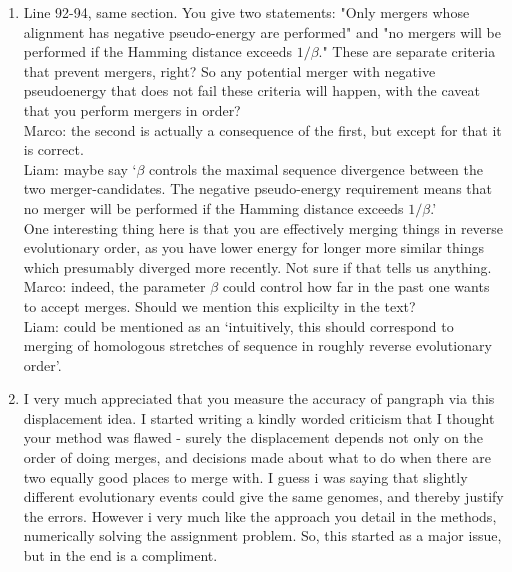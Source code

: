 \documentclass[aps,rmp,onecolumn]{revtex4-1}
\newcommand{\Marco}[1]{{\color{gray}Marco: #1}}
\newcommand{\Liam}[1]{{\color{teal}Liam: #1}}
\begin{document}
\begin{enumerate}
      \item Line 92-94, same section. You give two statements:
            "Only mergers whose alignment has negative pseudo-energy are performed"
            and
            "no mergers will be performed if the Hamming distance exceeds $1/\beta$."
            These are separate criteria that prevent mergers, right? So any potential merger with negative pseudoenergy that does not fail these criteria will happen, with the caveat that you perform mergers in order?\\
            \Marco{the second is actually a consequence of the first, but except for that it is correct.}\\
            \Liam{maybe say `$\beta$ controls the maximal sequence divergence between the two merger-candidates. The negative pseudo-energy requirement means that no merger will be performed if the Hamming distance exceeds $1/\beta$.'}\\
            One interesting thing here is that you are effectively merging things in reverse evolutionary order, as you have lower energy for longer more similar things which presumably diverged more recently. Not sure if that tells us anything.\\
            \Marco{indeed, the parameter $\beta$ could control how far in the past one wants to accept merges. Should we mention this explicilty in the text?}\\
            \Liam{could be mentioned as an `intuitively, this should correspond to merging of homologous stretches of sequence in roughly reverse evolutionary order'.}

      \item I very much appreciated that you measure the accuracy of pangraph via this displacement idea. I started writing a kindly worded criticism that I thought your method was flawed - surely the displacement depends not only on the order of doing merges, and decisions made about what to do when there are two equally good places to merge with. I guess i was saying that slightly different evolutionary events could give the same genomes, and thereby justify the errors. However i very much like the approach you detail in the methods, numerically solving the assignment problem. So, this started as a major issue, but in the end is a compliment.


\end{enumerate}
\end{document}
